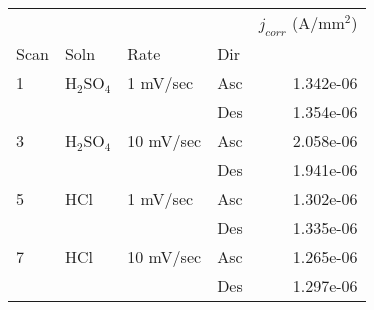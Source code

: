 \begin{tabular}{llllr}
\toprule
  &     &           &     &  $j_{corr}$ (A/mm$^2$) \\
Scan & Soln & Rate & Dir &                        \\
\midrule
1 & H$_2$SO$_4$ & 1 mV/sec & Asc &              1.342e-06 \\
  &     &           & Des &              1.354e-06 \\
3 & H$_2$SO$_4$ & 10 mV/sec & Asc &              2.058e-06 \\
  &     &           & Des &              1.941e-06 \\
5 & HCl & 1 mV/sec & Asc &              1.302e-06 \\
  &     &           & Des &              1.335e-06 \\
7 & HCl & 10 mV/sec & Asc &              1.265e-06 \\
  &     &           & Des &              1.297e-06 \\
\bottomrule
\end{tabular}

